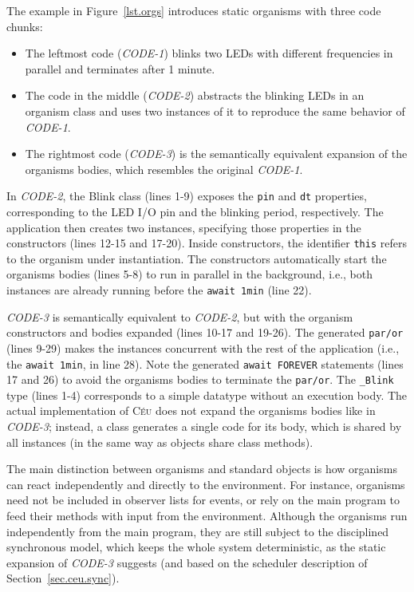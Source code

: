 \documentclass{acm_proc_article-sp}
\newcommand{\CEU}{\textsc{C\'{e}u}\xspace}
\newcommand{\code}[1] {{\small{\texttt{#1}}}}
\newcommand{\1}{\;}
\newcommand{\2}{\;\;}
\newcommand{\3}{\;\;\;}
\newcommand{\5}{\;\;\;\;\;}
\begin{document}
The example in Figure~\ref{lst.orgs} introduces static organisms with three 
code chunks:
%
\begin{itemize}
\item The leftmost code (\emph{CODE-1}) blinks two LEDs with different 
frequencies in parallel and terminates after 1 minute.
%
\item The code in the middle (\emph{CODE-2}) abstracts the blinking LEDs in an 
organism class and uses two instances of it to reproduce the same behavior of 
\emph{CODE-1}.
%
\item The rightmost code (\emph{CODE-3}) is the semantically equivalent 
expansion of the organisms bodies, which resembles the original \emph{CODE-1}.
\end{itemize}
%
In \emph{CODE-2}, the Blink class (lines 1-9) exposes the \code{pin} and 
\code{dt} properties, corresponding to the LED I/O pin and the blinking period, 
respectively.
The application then creates two instances, specifying those properties in the 
constructors (lines 12-15 and 17-20).
Inside constructors, the identifier \code{this} refers to the organism under 
instantiation.
The constructors automatically start the organisms bodies (lines 5-8) to run in 
parallel in the background, i.e., both instances are already running before the 
\code{await 1min} (line 22).

\emph{CODE-3} is semantically equivalent to \emph{CODE-2}, but with the 
organism constructors and bodies expanded (lines 10-17 and 19-26).
The generated \code{par/or} (lines 9-29) makes the instances concurrent with 
the rest of the application (i.e., the \code{await 1min}, in line 28).
Note the generated \code{await FOREVER} statements (lines 17 and 26) to avoid 
the organisms bodies to terminate the \code{par/or}.
The \code{\_Blink} type (lines 1-4) corresponds to a simple datatype without an
execution body.
%
The actual implementation of \CEU does not expand the organisms bodies like in 
\emph{CODE-3}; instead, a class generates a single code for its body, which is 
shared by all instances (in the same way as objects share class methods).

The main distinction between organisms and standard objects is how organisms 
can react independently and directly to the environment.
%
For instance, organisms need not be included in observer lists for events, or 
rely on the main program to feed their methods with input from the environment.
%
Although the organisms run independently from the main program, they are still 
subject to the disciplined synchronous model, which keeps the whole system 
deterministic, as the static expansion of \emph{CODE-3} suggests (and based on 
the scheduler description of Section~\ref{sec.ceu.sync}).
%
\end{document}
